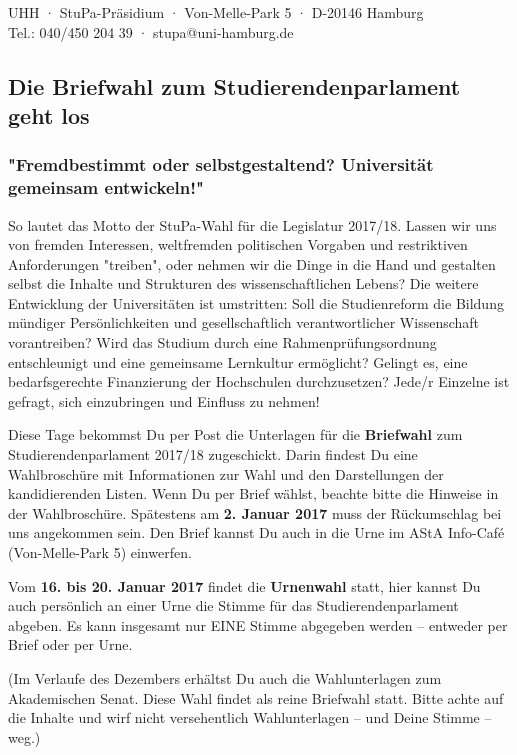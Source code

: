 \documentclass[a4paper,ngerman,headheight=80pt,12pt,DIV=calc]{scrartcl}
\begin{document}
    UHH · StuPa-Präsidium · Von-Melle-Park 5 · D-20146 Hamburg\\
    Tel.: 040/450 204 39 · stupa@uni-hamburg.de

    \subsection*{Die Briefwahl zum Studierendenparlament geht los}
    \subsubsection*{"Fremdbestimmt oder selbstgestaltend? Universität gemeinsam entwickeln!"}

    So lautet das Motto der StuPa-Wahl für die Legislatur 2017/18. Lassen wir
    uns von fremden Interessen, weltfremden politischen Vorgaben und restriktiven
    Anforderungen "treiben", oder nehmen wir die Dinge in die Hand und gestalten
    selbst die Inhalte und Strukturen des wissenschaftlichen Lebens?
    Die weitere Entwicklung der Universitäten ist umstritten: Soll die Studienreform
    die Bildung mündiger Persönlichkeiten und gesellschaftlich verantwortlicher
    Wissenschaft vorantreiben? Wird das Studium durch eine Rahmenprüfungsordnung
    entschleunigt und eine gemeinsame Lernkultur ermöglicht? Gelingt es, eine
    bedarfsgerechte Finanzierung der Hochschulen durchzusetzen?
    Jede/r Einzelne ist gefragt, sich einzubringen und Einfluss zu nehmen!

    Diese Tage bekommst Du per Post die Unterlagen für die \textbf{Briefwahl} zum
    Studierendenparlament 2017/18 zugeschickt. Darin findest Du eine Wahlbroschüre
    mit Informationen zur Wahl und den Darstellungen der kandidierenden Listen.
    Wenn Du per Brief wählst, beachte bitte die Hinweise in der Wahlbroschüre.
    Spätestens am \textbf{2. Januar 2017} muss der Rückumschlag bei uns angekommen sein.
    Den Brief kannst Du auch in die Urne im AStA Info-Café (Von-Melle-Park 5)
    einwerfen.

    Vom \textbf{16. bis 20. Januar 2017} findet die \textbf{Urnenwahl} statt,
    hier kannst Du auch persönlich an einer Urne die Stimme für das
    Studierendenparlament abgeben. Es kann insgesamt nur EINE Stimme abgegeben
    werden – entweder per Brief oder per Urne.

    (Im Verlaufe des Dezembers erhältst Du auch die Wahlunterlagen zum
    Akademischen Senat. Diese Wahl findet als reine Briefwahl statt. Bitte achte
    auf die Inhalte und wirf nicht versehentlich Wahlunterlagen – und Deine
    Stimme – weg.)
\end{document}
